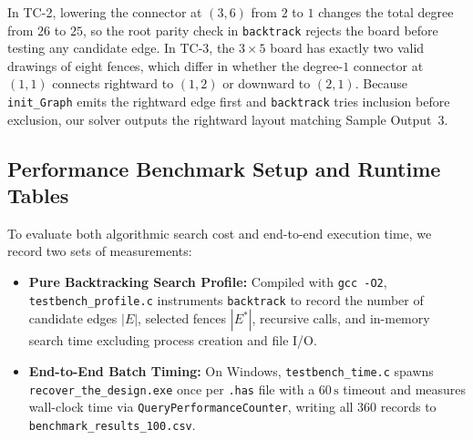 \documentclass[10pt, a4paper]{article}
\newcommand{\code}[1]{\texttt{\color{primary!90!black}#1}}
\begin{document}
In TC-2, lowering the connector at $(3,6)$ from $2$ to $1$ changes the total degree from $26$ to $25$, so the root parity check in \code{backtrack} rejects the board before testing any candidate edge. In TC-3, the $3 \times 5$ board has exactly two valid drawings of eight fences, which differ in whether the degree-$1$ connector at $(1,1)$ connects rightward to $(1,2)$ or downward to $(2,1)$. Because \code{init\_Graph} emits the rightward edge first and \code{backtrack} tries inclusion before exclusion, our solver outputs the rightward layout matching Sample Output~3.

\subsection{Performance Benchmark Setup and Runtime Tables}
To evaluate both algorithmic search cost and end-to-end execution time, we record two sets of measurements:
\begin{itemize}
  \item \textbf{Pure Backtracking Search Profile:} Compiled with \texttt{gcc -O2}, \code{testbench\_profile.c} instruments \code{backtrack} to record the number of candidate edges $|E|$, selected fences $|E^*|$, recursive calls, and in-memory search time excluding process creation and file I/O.
  \item \textbf{End-to-End Batch Timing:} On Windows, \code{testbench\_time.c} spawns \code{recover\_the\_design.exe} once per \code{.has} file with a $60\,\text{s}$ timeout and measures wall-clock time via \code{QueryPerformanceCounter}, writing all $360$ records to \code{benchmark\_results\_100.csv}.
\end{itemize}
\end{document}
